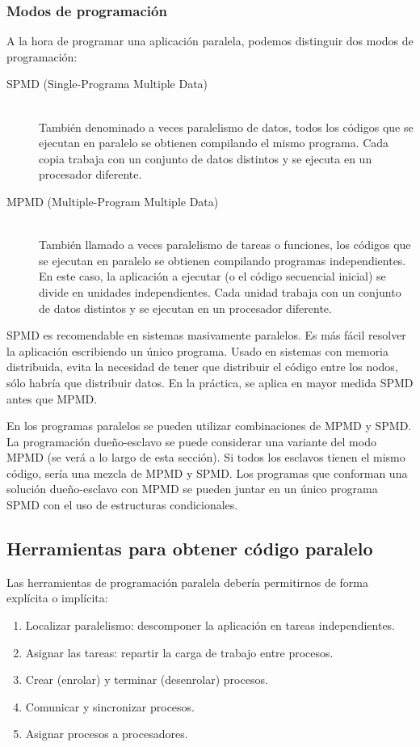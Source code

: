 \subsubsection{Modos de programación}
A la hora de programar una aplicación paralela, podemos distinguir dos modos de programación:
\begin{description}
    \item [SPMD (Single-Programa Multiple Data)]~\\
        También denominado a veces paralelismo de datos, todos los códigos que se ejecutan en paralelo se obtienen compilando el mismo programa. Cada copia trabaja con un conjunto de datos distintos y se ejecuta en un procesador diferente.
    \item [MPMD (Multiple-Program Multiple Data)]~\\
        También llamado a veces paralelismo de tareas o funciones, los códigos que se ejecutan en paralelo se obtienen compilando programas independientes. En este caso, la aplicación a ejecutar (o el código secuencial inicial) se divide en unidades independientes. Cada unidad trabaja con un conjunto de datos distintos y se ejecutan en un procesador diferente.
\end{description}

SPMD es recomendable en sistemas masivamente paralelos. Es más fácil resolver la aplicación escribiendo un único programa. Usado en sistemas con memoria distribuida, evita la necesidad de tener que distribuir el código entre los nodos, sólo habría que distribuir datos. En la práctica, se aplica en mayor medida SPMD antes que MPMD.

En los programas paralelos se pueden utilizar combinaciones de MPMD y SPMD. La programación dueño-esclavo se puede considerar una variante del modo MPMD (se verá a lo largo de esta sección). Si todos los esclavos tienen el mismo código, sería una mezcla de MPMD y SPMD. Los programas que conforman una solución dueño-esclavo con MPMD se pueden juntar en un único programa SPMD con el uso de estructuras condicionales.

\subsection{Herramientas para obtener código paralelo}
Las herramientas de programación paralela debería permitirnos de forma explícita o implícita:
\begin{enumerate}
    \item Localizar paralelismo: descomponer la aplicación en tareas independientes.
    \item Asignar las tareas: repartir la carga de trabajo entre procesos.
    \item Crear (enrolar) y terminar (desenrolar) procesos.
    \item Comunicar y sincronizar procesos.
    \item Asignar procesos a procesadores.
\end{enumerate}

